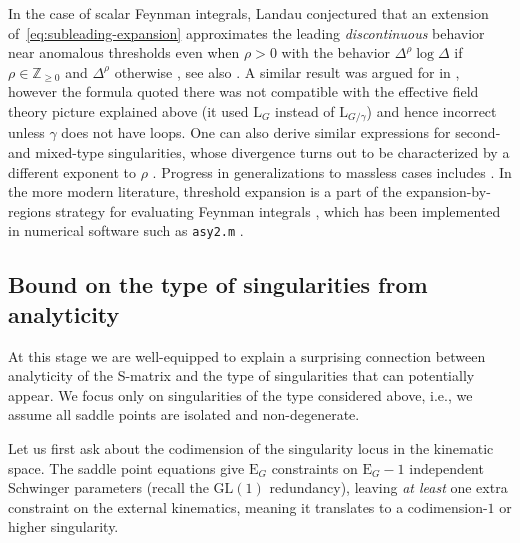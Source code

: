 \documentclass[12pt]{article}
\numberwithin{figure}{section}
\def \E {\mathrm{E}}
\def \L {\mathrm{L}}
\def \geq {\geqslant}
\def \Z {\mathbb{Z}}
\def \GL {\mathrm{GL}}
\def \upgamma {\rho}
\begin{document}
				In the case of scalar Feynman integrals, Landau conjectured that an extension of~\eqref{eq:subleading-expansion} approximates the leading \emph{discontinuous} behavior near anomalous thresholds even when $\upgamma > 0$ with the behavior $\Delta^{\upgamma}\log\Delta$ if $\upgamma \in \Z_{\geq 0}$ and $\Delta^\upgamma$ otherwise \cite{Landau:1959fi,pham2011singularities}, see also \cite{Hannesdottir:2021kpd}.
				A similar result was argued for in \cite{Polkinghorne1960,Eden:1966dnq}, however the formula quoted there was not compatible with the effective field theory picture explained above (it used $\L_{G}$ instead of $\L_{G/\gamma}$) and hence incorrect unless $\gamma$ does not have loops.
				One can also derive similar expressions for second- and mixed-type singularities, whose divergence turns out to be characterized by a different exponent to $\upgamma$ \cite{nakanishi1971graph,Greenman1969}. Progress in generalizations to massless cases includes \cite{Kinoshita:1962ur,Kinoshita:1975ie}.
				In the more modern literature, threshold expansion is a part of the expansion-by-regions strategy for evaluating Feynman integrals
				\cite{Beneke:1997zp,Smirnov:2002pj,Ferroglia:2002mz,Semenova:2018cwy}, which has been implemented in numerical software such as \texttt{asy2.m} \cite{Jantzen:2012mw}.
				
				
				\subsection{\label{sec:bound}Bound on the type of singularities from analyticity}
				
				At this stage we are well-equipped to explain a surprising connection between analyticity of the S-matrix and the type of singularities that can potentially appear. We focus only on singularities of the type considered above, i.e., we assume all saddle points are isolated and non-degenerate.
				
				Let us first ask about the codimension of the singularity locus in the kinematic space. The saddle point equations give $\E_G$ constraints on $\E_G {-} 1$ independent Schwinger parameters (recall the $\GL(1)$ redundancy), leaving \emph{at least} one extra constraint on the external kinematics, meaning it translates to a codimension-$1$ or higher singularity.
				
\end{document}
